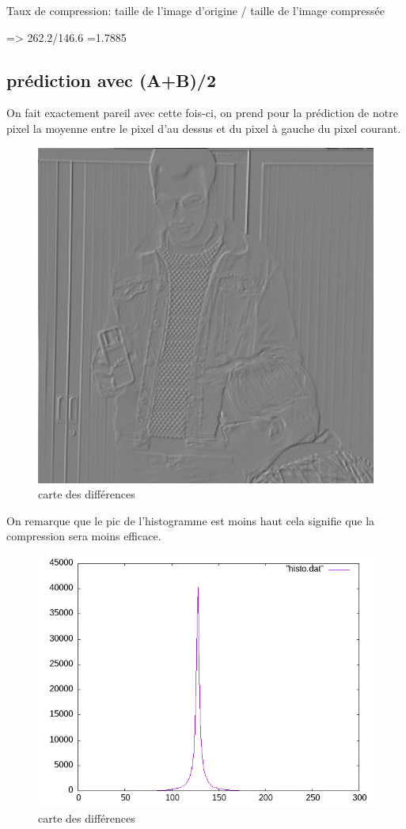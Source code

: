 \documentclass{article}
\begin{document}
Taux de compression: taille de l'image d'origine / taille de l'image compressée

=> 262.2/146.6 =1.7885

\newpage
\subsection{prédiction avec (A+B)/2}
On fait exactement pareil avec cette fois-ci, on prend pour la prédiction de notre pixel la moyenne entre le pixel d'au dessus et du pixel à gauche du pixel courant.
\begin{figure}[h]
\centerline{\includegraphics[scale=0.7]{./rendus/MaribaultErreurPredAplusBsur2.png} }
\caption{carte des différences}
\end{figure}

On remarque que le pic de l'histogramme est moins haut cela signifie que la compression sera moins efficace.
\begin{figure}[h]
\centerline{\includegraphics[scale=0.7]{./rendus/histoAplusBsur2.png} }
\caption{carte des différences}
\end{figure}
\end{document}
